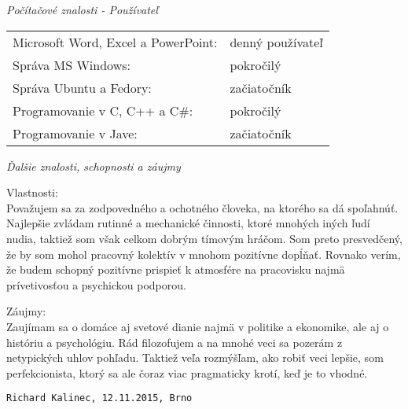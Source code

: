 \documentclass{article}
\begin{document}
\begin{flushleft}
\bigskip

\Large
\textit{\textsf{Počítačové znalosti - Používateľ\\}}
\normalsize

\smallskip

\begin{adjustwidth}{-6pt}{}
	\begin{tabular}{l l}
		Microsoft Word, Excel a PowerPoint: & denný používateľ \\
		Správa MS Windows: & pokročilý \\
		Správa Ubuntu a Fedory: & začiatočník \\
		Programovanie v C, C++ a C\#: & pokročilý \\
		Programovanie v Jave: & začiatočník
	\end{tabular}
\end{adjustwidth}

\bigskip

\Large
\textit{\textsf{Ďalšie znalosti, schopnosti a záujmy\\}}
\normalsize

\smallskip

Vlastnosti:\\
Považujem sa za zodpovedného a ochotného človeka, na ktorého sa dá spoľahnúť. Najlepšie zvládam rutinné a mechanické činnosti, ktoré mnohých iných ľudí nudia, taktiež som však celkom dobrým tímovým hráčom. Som preto presvedčený, že by som mohol pracovný kolektív v mnohom pozitívne dopĺňať. Rovnako verím, že budem schopný pozitívne prispieť k atmosfére na pracovisku najmä prívetivosťou a psychickou podporou.

\smallskip

Záujmy:\\
Zaujímam sa o domáce aj svetové dianie najmä v politike a ekonomike,
ale aj o históriu a psychológiu. Rád filozofujem a na mnohé veci sa
pozerám z netypických uhlov pohľadu. Taktiež veľa rozmýšľam, ako robiť veci lepšie, som perfekcionista, ktorý sa ale čoraz viac pragmaticky krotí, keď je to vhodné.\\

\bigskip

\texttt{Richard Kalinec, 12.11.2015, Brno}

\pagebreak



\end{flushleft}
\end{document}

